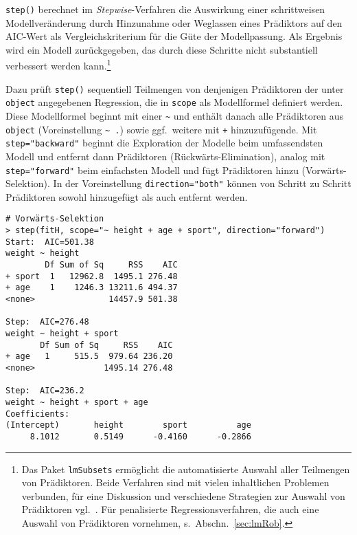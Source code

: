 \lstinline!step()! berechnet im \emph{Stepwise}-Verfahren die Auswirkung einer schrittweisen Modellveränderung durch Hinzunahme oder Weglassen eines Prädiktors auf den AIC-Wert als Vergleichskriterium für die Güte der Modellpassung. Als Ergebnis wird ein Modell zurückgegeben, das durch diese Schritte nicht substantiell verbessert werden kann.\footnote{Das Paket \lstinline!lmSubsets! \cite{Hofmann2020b} ermöglicht die automatisierte Auswahl aller Teilmengen von Prädiktoren. Beide Verfahren sind mit vielen inhaltlichen Problemen verbunden, für eine Diskussion und verschiedene Strategien zur Auswahl von Prädiktoren vgl.\ . Für penalisierte Regressionsverfahren, die auch eine Auswahl von Prädiktoren vornehmen, s.\ Abschn.\ \ref{sec:lmRob}.}

Dazu prüft \lstinline!step()! sequentiell Teilmengen von denjenigen Prädiktoren der unter \lstinline!object! angegebenen Regression, die in \lstinline!scope! als Modellformel definiert werden. Diese Modellformel beginnt mit einer \lstinline!~! und enthält danach alle Prädiktoren aus \lstinline!object! (Voreinstellung \lstinline!~ .!) sowie ggf.\ weitere mit \lstinline!+! hinzuzufügende. Mit \lstinline!step="backward"! beginnt die Exploration der Modelle beim umfassendsten Modell und entfernt dann Prädiktoren (Rückwärts-Elimination), analog mit \lstinline!step="forward"! beim einfachsten Modell und fügt Prädiktoren hinzu (Vorwärts-Selektion). In der Voreinstellung \lstinline!direction="both"! können von Schritt zu Schritt Prädiktoren sowohl hinzugefügt als auch entfernt werden.
\begin{lstlisting}
# Vorwärts-Selektion
> step(fitH, scope="~ height + age + sport", direction="forward")
Start:  AIC=501.38
weight ~ height
        Df Sum of Sq     RSS    AIC
+ sport  1   12962.8  1495.1 276.48
+ age    1    1246.3 13211.6 494.37
<none>               14457.9 501.38

Step:  AIC=276.48
weight ~ height + sport
       Df Sum of Sq     RSS    AIC
+ age   1     515.5  979.64 236.20
<none>              1495.14 276.48

Step:  AIC=236.2
weight ~ height + sport + age
Coefficients:
(Intercept)       height        sport          age  
     8.1012       0.5149      -0.4160      -0.2866 
\end{lstlisting}

